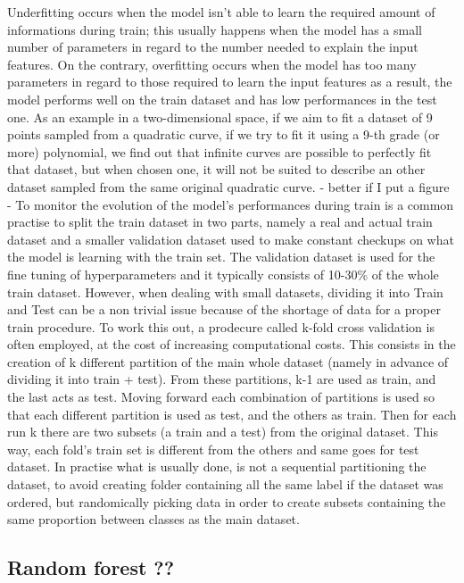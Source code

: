 \documentclass[a4paper,11pt]{article}
\begin{document}
Underfitting occurs when the model isn't able to learn the required amount of informations during train; this usually happens when the model has a small number of parameters in regard to the number needed to explain the input features. On the contrary, overfitting occurs when the model has too many parameters in regard to those required to learn the input features as a result, the model performs well on the train dataset and has low performances in the test one.
As an example in a two-dimensional space, if we aim to fit a dataset of 9 points sampled from a quadratic curve, if we try to fit it using a 9-th grade (or more) polynomial, we find out that infinite curves are possible to perfectly fit that dataset, but when chosen one, it will not be suited to describe an other dataset sampled from the same original quadratic curve. - better if I put a figure -
To monitor the evolution of the model's performances during train is a common practise to  split the train dataset in two parts, namely a real and actual train dataset and a smaller validation dataset used to make constant checkups on what the model is learning with the train set.
The validation dataset is used for the fine tuning of hyperparameters and it typically consists of 10-30\% of the whole train dataset.
However, when dealing with small datasets, dividing it into Train and Test can be a non trivial issue because of the shortage of data for a proper train procedure. To work this out, a prodecure called k-fold cross validation is often employed, at the cost of increasing computational costs.
This consists in the creation of k different partition of the main whole dataset (namely in advance of dividing it into train + test).
From these partitions, k-1 are used as train, and the last acts as test. Moving forward each combination of partitions is used so that each different partition is used as test, and the others as train.
Then for each run k there are two subsets (a train and a test) from the original dataset. This way, each fold's train set is different from the others and same goes for test dataset.
In practise what is usually done, is not a sequential partitioning the dataset, to avoid creating folder containing all the same label if the dataset was ordered, but randomically picking data in order to create subsets containing the same proportion between classes as the main dataset.

\subsection{Random forest ??}
\end{document}
